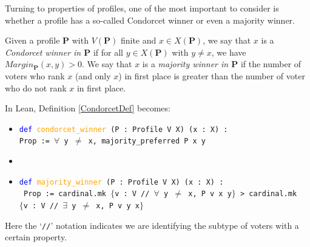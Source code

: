 \documentclass[runningheads]{llncs}
\begin{document}
Turning to properties of profiles, one of the most important to consider is whether a profile has a so-called Condorcet winner or even a majority winner.

\begin{definition}\label{CondorcetDef} \textnormal{Given a profile $\mathbf{P}$ with $V(\mathbf{P})$ finite and $x\in X(\mathbf{P})$, we say that $x$ is a \textit{Condorcet winner in $\mathbf{P}$} if for all $y\in X(\mathbf{P})$ with $y\neq x$, we have $Margin_\mathbf{P}(x,y)>0$. We say that $x$ is a \textit{majority winner in $\mathbf{P}$} if the number of voters who rank $x$ (and only $x$) in first place is greater than the number of voter who do not rank $x$ in first place.}
\end{definition}
In Lean, Definition \ref{CondorcetDef} becomes:

\begin{itemize}
\item[] \texttt{\textcolor{blue}{def} \textcolor{orange}{condorcet\_winner} (P : Profile V X) (x : X) :} \\ \texttt{Prop := $\forall$ y $\neq$ x, majority\_preferred P x y}
\item[]
\item[] \texttt{\textcolor{blue}{def} \textcolor{orange}{majority\_winner} (P : Profile V X) (x : X) :} \\
\texttt{ Prop := cardinal.mk $\{$v : V // $\forall$ y $\neq$ x, P v x y$\}$ > cardinal.mk} \\ \texttt{$\{$v : V // $\exists$ y $\neq$ x, P v y x$\}$}
\end{itemize}
Here the `\texttt{//}' notation indicates we are identifying the subtype of voters with a certain property. 
\end{document}
